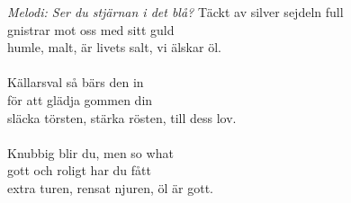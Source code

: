 {\footnotesize\textit{Melodi: Ser du stjärnan i det blå?}}
\vspace{10pt}
Täckt av silver sejdeln full\\
gnistrar mot oss med sitt guld\\
humle, malt, är livets salt, vi älskar öl.\\
\\
Källarsval så bärs den in\\
för att glädja gommen din\\
släcka törsten, stärka rösten, till dess lov.\\
\\
Knubbig blir du, men so what\\
gott och roligt har du fått\\
extra turen, rensat njuren, öl är gott.
